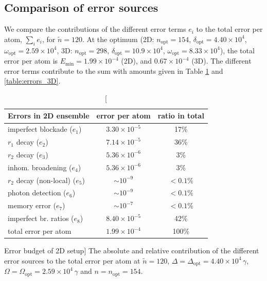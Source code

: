 \subsection{Comparison of error sources}
We compare the contributions of the different error terms $e_i$ to the total
error per atom, $\sum_i e_i$, for $\tilde n = 120$. At the optimum
(2D: $n_\mathrm{opt} = 154$, $\delta_\mathrm{opt} = 4.40\times 10^4$,
$\omega_\mathrm{opt} = 2.59\times 10^4$, 3D: $n_\mathrm{opt} = 298$,
$\delta_\mathrm{opt} = 10.9\times 10^4$, $\omega_\mathrm{opt} = 8.33\times 10^4$), 
the total error per atom is $E_\mathrm{min} = 
1.99\times 10^{-4}$ (2D), and $0.67\times 10^{-4}$ (3D).
The different error terms contribute to the sum with amounts given in Table
\ref{table:errors_2D} and \ref{table:errors_3D}.
\begin{table}
\centering
\begin{tabular}{|l|c|c|}
\hline
 Errors in 2D ensemble & error per atom & ratio in total\\
\hline
imperfect blockade ($e_1$) & $3.30 \times 10^{-5}$ & 17\%\\
$r_1$ decay ($e_2$) & $7.14 \times 10^{-5}$ & 36\%\\
$r_2$ decay ($e_3$) & $5.36 \times 10^{-6}$ & 3\%\\
inhom. broadening ($e_4$) & $5.36 \times 10^{-6}$ & 3\%\\
$r_2$ decay (non-local) ($e_5$) & $ \sim 10^{-9}$ & $<0.1$\%\\
photon detection ($e_6$) & $ \sim 10^{-9}$ & $<0.1$\%\\
memory error ($e_7$) & $ \sim 10^{-7}$ & $<0.1$\%\\
imperfect br. ratios ($e_8$) & $8.40 \times 10^{-5}$ & 42\%\\
\hline
total error per atom & $1.99 \times 10^{-4}$ & 100\%\\
\hline
\end{tabular}
\caption
[Error budget of 2D setup]
{
\label{table:errors_2D}
The absolute and relative contribution of the different error sources to the
total error per atom at $\tilde n = 120$, $\Delta =
\Delta_\mathrm{opt} = 4.40\times 10^4\,\gamma$, $\Omega = \Omega_\mathrm{opt} = 
2.59\times 10^4\,\gamma$ and $n = n_\mathrm{opt} = 154$.}
\end{table}


